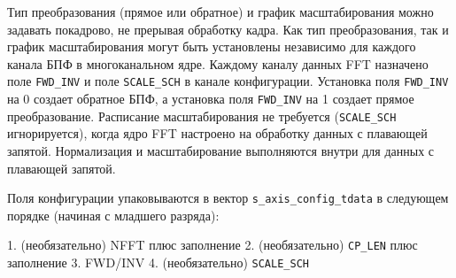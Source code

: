 Тип преобразования (прямое или обратное) и график масштабирования можно задавать покадрово, не прерывая обработку кадра. Как тип преобразования, так и график масштабирования могут быть установлены независимо для каждого канала БПФ в многоканальном ядре. Каждому каналу данных FFT назначено поле \verb|FWD_INV| и поле \verb|SCALE_SCH| в канале конфигурации. 
Установка поля \verb|FWD_INV| на 0 создает обратное БПФ, а установка поля \verb|FWD_INV| на 1 создает прямое преобразование. Расписание масштабирования не требуется (\verb|SCALE_SCH| игнорируется), когда ядро FFT настроено на обработку данных с плавающей запятой. Нормализация и масштабирование выполняются внутри для данных с плавающей запятой.

Поля конфигурации упаковываются в вектор \verb|s_axis_config_tdata| в следующем порядке (начиная с младшего разряда):

1. (необязательно) NFFT плюс заполнение 2. (необязательно) \verb|CP_LEN| плюс заполнение 3. FWD/INV 4. (необязательно) \verb|SCALE_SCH|

